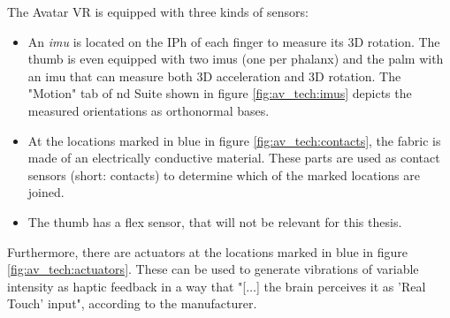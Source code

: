 \documentclass[hyperref, bachelorofscience]{cgvpub}
\begin{document}
The Avatar VR is equipped with three kinds of sensors: 
\vspace{.3cm}
\begin{itemize}
	\item An \emph{\acrfull{imu}} is located on the \gls{IPh} of each finger to measure its 3D rotation. The thumb is even equipped with two \acrshort{imu}s (one per phalanx) and the palm with an \acrshort{imu} that can measure both 3D acceleration and 3D rotation. The "Motion" tab of \acrshort{nd} Suite shown in figure \ref{fig:av_tech:imus} depicts the measured orientations as orthonormal bases. 
	\item At the locations marked in blue in figure \ref{fig:av_tech:contacts}, the fabric is made of an electrically conductive material. These parts are used as contact sensors (short: contacts) to determine which of the marked locations are joined.
	\item The thumb has a flex sensor, that will not be relevant for this thesis.
\end{itemize}

Furthermore, there are actuators at the locations marked in blue in figure \ref{fig:av_tech:actuators}. These can be used to generate vibrations of variable intensity as haptic feedback in a way that "[$\dots$] the brain perceives it as 'Real Touch' input", according to the manufacturer.
\end{document}
